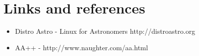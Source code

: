 \section{Links and references}

\begin{itemize}
    \item Distro Astro - Linux for Astronomers http://distroastro.org
    \item AA++ - http://www.naughter.com/aa.html
\end{itemize}
